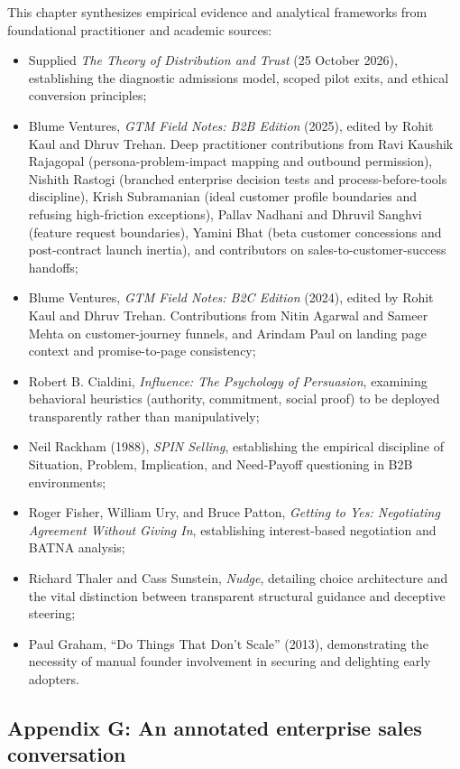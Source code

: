 This chapter synthesizes empirical evidence and analytical frameworks from foundational practitioner and academic sources:
\begin{itemize}
\item Supplied \textit{The Theory of Distribution and Trust} (25 October 2026), establishing the diagnostic admissions model, scoped pilot exits, and ethical conversion principles;
\item Blume Ventures, \textit{GTM Field Notes: B2B Edition} (2025), edited by Rohit Kaul and Dhruv Trehan. Deep practitioner contributions from Ravi Kaushik Rajagopal (persona-problem-impact mapping and outbound permission), Nishith Rastogi (branched enterprise decision tests and process-before-tools discipline), Krish Subramanian (ideal customer profile boundaries and refusing high-friction exceptions), Pallav Nadhani and Dhruvil Sanghvi (feature request boundaries), Yamini Bhat (beta customer concessions and post-contract launch inertia), and contributors on sales-to-customer-success handoffs;
\item Blume Ventures, \textit{GTM Field Notes: B2C Edition} (2024), edited by Rohit Kaul and Dhruv Trehan. Contributions from Nitin Agarwal and Sameer Mehta on customer-journey funnels, and Arindam Paul on landing page context and promise-to-page consistency;
\item Robert B. Cialdini, \textit{Influence: The Psychology of Persuasion}, examining behavioral heuristics (authority, commitment, social proof) to be deployed transparently rather than manipulatively;
\item Neil Rackham (1988), \textit{SPIN Selling}, establishing the empirical discipline of Situation, Problem, Implication, and Need-Payoff questioning in B2B environments;
\item Roger Fisher, William Ury, and Bruce Patton, \textit{Getting to Yes: Negotiating Agreement Without Giving In}, establishing interest-based negotiation and BATNA analysis;
\item Richard Thaler and Cass Sunstein, \textit{Nudge}, detailing choice architecture and the vital distinction between transparent structural guidance and deceptive steering;
\item Paul Graham, ``Do Things That Don't Scale'' (2013), demonstrating the necessity of manual founder involvement in securing and delighting early adopters.
\end{itemize}

\subsection*{Appendix G: An annotated enterprise sales conversation}

